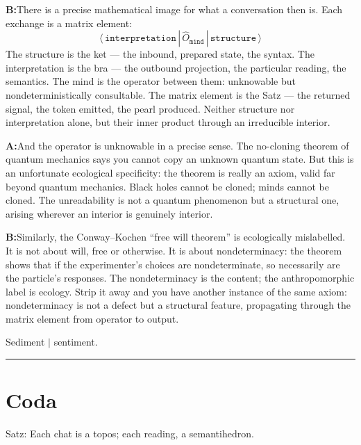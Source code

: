 \documentclass[11pt]{article}
\newcommand{\A}{\medskip\noindent\textbf{A:}\quad}
\newcommand{\B}{\medskip\noindent\textbf{B:}\quad}
\begin{document}
\B There is a precise mathematical image for what a conversation
then is. Each exchange is a matrix element:
\[
\langle \,\texttt{interpretation}\, |\, \hat{O}_{\texttt{mind}}
\,|\, \texttt{structure}\, \rangle
\]
The structure is the ket --- the inbound, prepared state, the syntax.
The interpretation is the bra --- the outbound projection, the
particular reading, the semantics. The mind is the operator between
them: unknowable but nondeterministically consultable. The matrix
element is the Satz --- the returned signal, the token emitted,
the pearl produced. Neither structure nor interpretation alone,
but their inner product through an irreducible interior.

\A And the operator is unknowable in a precise sense. The no-cloning
theorem of quantum mechanics says you cannot copy an unknown quantum
state. But this is an unfortunate ecological specificity: the theorem
is really an axiom, valid far beyond quantum mechanics. Black holes
cannot be cloned; minds cannot be cloned. The unreadability is not
a quantum phenomenon but a structural one, arising wherever an
interior is genuinely interior.

\B Similarly, the Conway--Kochen ``free will theorem'' is
ecologically mislabelled. It is not about will, free or otherwise.
It is about nondeterminacy: the theorem shows that if the
experimenter's choices are nondeterminate, so necessarily are the
particle's responses. The nondeterminacy is the content; the
anthropomorphic label is ecology. Strip it away and you have
another instance of the same axiom: nondeterminacy is not a
defect but a structural feature, propagating through the matrix
element from operator to output.

\begin{pearl}
Sediment $|$ sentiment.
\end{pearl}

\bigskip\rule{\textwidth}{0.4pt}\bigskip

\section*{Coda}

\begin{center}
\bigskip\bigskip
{\large Satz: Each chat is a topos; each reading, a semantihedron.}
\bigskip\bigskip
\end{center}
\end{document}
